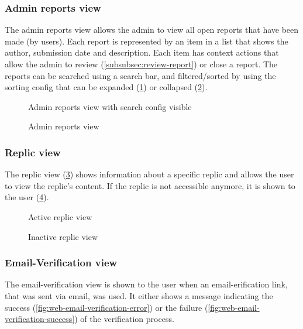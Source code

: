 \subsubsection{Admin reports view}
The admin reports view allows the admin to view all open reports that have been made (by users).
Each report is represented by an item in a list that shows the author, submission date and description.
Each item has context actions that allow the admin to review (\ref{subsubsec:review-report}) or close a report.
The reports can be searched using a search bar, and filtered/sorted by using the sorting config that can be expanded (\ref{fig:web-reports-config-view}) or collapsed (\ref{fig:web-reports-noconfig-view}).
\begin{figure}
    \centering

    \caption{Admin reports view with search config visible}
    \label{fig:web-reports-config-view}
\end{figure}
\begin{figure}
    \centering

    \caption{Admin reports view}
    \label{fig:web-reports-noconfig-view}
\end{figure}

\subsubsection{Replic view}
The replic view (\ref{fig:web-replic-active-view}) shows information about a specific replic and allows the user to view the replic's content.
If the replic is not accessible anymore, it is shown to the user (\ref{fig:web-replic-inactive-view}).
\begin{figure}
    \centering

    \caption{Active replic view}
    \label{fig:web-replic-active-view}
\end{figure}
\begin{figure}
    \centering

    \caption{Inactive replic view}
    \label{fig:web-replic-inactive-view}
\end{figure}

\subsubsection{Email-Verification view}
The email-verification view is shown to the user when an email-erification link, that was sent via email, was used.
It either shows a message indicating the success (\ref{fig:web-email-verification-error}) or the failure (\ref{fig:web-email-verification-success}) of the verification process.

